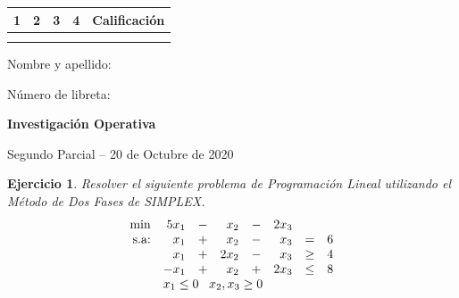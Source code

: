 \documentclass[a4paper,oneside,12pt]{amsart}
\newcommand{\nombremateria}
{Investigaci\'on Operativa}
\newcommand{\numeroparcial}
    { Segundo Parcial }
\newcommand{\fecha}
    {20 de Octubre de 2020}
\newtheorem{quest}{Ejercicio}
\begin{document}
\hfill \hfill
\begin{tabular}[c]{|c|c|c|c|c|}
\hline 
1 & 2 & 3 & 4 & Calificaci\'on \\ \hline \hline
\hspace{1 cm} & \hspace{1 cm} & \hspace{1 cm} & \hspace{1 cm} & \hspace{1.3 cm} \\
\hspace{1 cm} & \hspace{1  cm} & \hspace{1  cm} & \hspace{1  cm} & \hspace{1.3 cm} \\ \hline

\end{tabular}

\vspace{-1cm}

\noindent Nombre y apellido:

\vspace{0.2cm}

\noindent Número de libreta:

\noindent \hrulefill 

\smallskip
\renewcommand{\baselinestretch}{1.1}

\begin{center}
	\large \textbf{\nombremateria} 
	
	\numeroparcial -- \fecha
\end{center}

\renewcommand{\theenumi}{\textbf{\arabic{enumi}}}


\begin{quest} Resolver el siguiente problema de Programación Lineal utilizando el Método de Dos Fases de SIMPLEX.
    \[\begin{array}{rrrrrrrr}
        \min & 5x_1 & - & x_2 & - & 2x_3  \\
        \text{s.a:} & x_1 & + & x_2 & - & x_3 & = & 6 \\
          & x_1 & + & 2x_2 & - & x_3 & \geq & 4 \\
          & -x_1  & + & x_2 & + & 2x_3 & \leq & 8 \\
         & \multicolumn{7}{l}{x_1\leq 0 \;\;\;x_2,x_3\geq 0}
    \end{array}
    \]

\end{quest}
\end{document}
